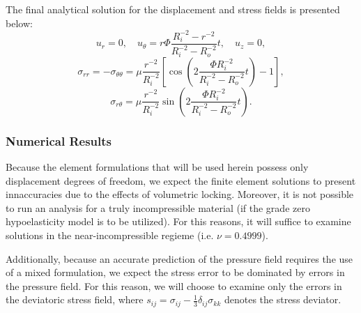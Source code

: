 The final analytical solution for the displacement and stress fields is presented below:
\begin{equation}
  u_r = 0, \quad u_\theta = r \Phi \frac{R_i^{-2} - r^{-2}}{R_i^{-2} - R_o^{-2}} t, \quad u_z = 0,
\end{equation}
\begin{equation}
  \sigma_{rr} = - \sigma_{\theta \theta} = \mu \frac{r^{-2}}{R_i^{-2}} \left[ \cos \left( 2 \frac{\Phi R_i^{-2}}{R_i^{-2} - R_o^{-2}} t \right) - 1 \right],
\end{equation}
\begin{equation}
  \sigma_{r \theta} = \mu \frac{r^{-2}}{R_i^{-2}} \sin \left( 2 \frac{\Phi R_i^{-2}}{R_i^{-2} - R_o^{-2}} t \right).
\end{equation}

\subsubsection*{Numerical Results}

Because the element formulations that will be used herein possess only displacement degrees of freedom, we expect the finite element solutions to present innaccuracies due to the effects of volumetric locking. Moreover, it is not possible to run an analysis for a truly incompressible material (if the grade zero hypoelasticity model is to be utilized). For this reasons, it will suffice to examine solutions in the near-incompressible regieme (i.e. $\nu = 0.4999$).

Additionally, because an accurate prediction of the pressure field requires the use of a mixed formulation, we expect the stress error to be dominated by errors in the pressure field. For this reason, we will choose to examine only the errors in the deviatoric stress field, where $s_{ij} = \sigma_{ij} - \frac{1}{3} \delta_{ij} \sigma_{kk}$ denotes the stress deviator.

